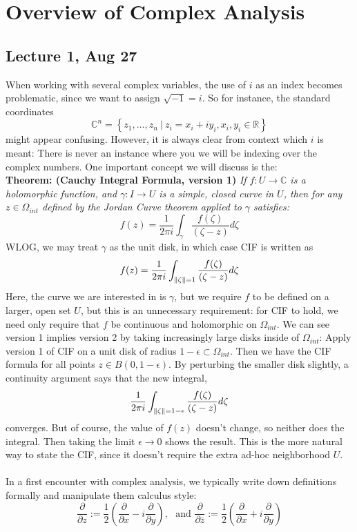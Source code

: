\documentclass[12pt]{report}
\theoremstyle{definition}
\theoremstyle{remark}
\numberwithin{equation}{section}
\theoremstyle{definition}
\newcommand{\bb}[1]{\mathbb{#1}}
\DeclarePairedDelimiter\norm{\lVert}{\rVert}%
\begin{document}
\chapter{Overview of Complex Analysis}
\section*{Lecture 1, Aug 27}
\label{sec:1}
When working with several complex variables, the use of $i$ as an index becomes problematic, since we want to assign $\sqrt{-1} = i$. So for instance, the standard coordinates 
$$
	\bb C^n = \left\{z_1,\dots,z_n\ |\ z_i = x_i + iy_i, x_i,y_i \in \bb R\right\}
$$
might appear confusing. However, it is always clear from context which $i$ is meant: There is never an instance where you we will be indexing over the complex numbers. One important concept we will discuss is the: \\
\textbf{Theorem: (Cauchy Integral Formula, version 1)} \textit{If $f: U \to \bb C$ is a holomorphic function, and $\gamma: I \to U$ is a simple, closed curve in $U$, then for any $z \in \Omega_{int}$ defined by the Jordan Curve theorem applied to $\gamma$ satisfies: }
$$
	f(z) = \frac{1}{2\pi i}\int_{\gamma} \frac{f(\zeta)}{(\zeta - z)} d\zeta 
$$
WLOG, we may treat $\gamma$ as the unit disk, in which case CIF is written as 
$$
		f(z) = \frac{1}{2\pi i}\int_{\norm{\zeta} = 1} \frac{f(\zeta)}{(\zeta - z)} d\zeta 
$$
Here, the curve we are interested in is $\gamma$, but we require $f$ to be defined on a larger, open set $U$, but this is an unnecessary requirement: for CIF to hold, we need only require that $f$ be continuous and holomorphic on $\Omega_{int}$. We can see version 1 implies version 2 	by taking increasingly large disks inside of $\Omega_{int}$: Apply version 1 of CIF on a unit disk of radius $1-\epsilon \subset \Omega_{int}$. Then we have the CIF formula for all points $z \in B(0,1-\epsilon)$. By perturbing the smaller disk slightly, a continuity argument says that the  new integral,
$$
	\frac{1}{2\pi i}\int_{\norm{\zeta} = 1-\epsilon} \frac{f(\zeta)}{(\zeta - z)} d\zeta 
$$
converges. But of course, the value of $f(z)$ doesn't change, so neither does the integral. Then taking the limit $\epsilon \to 0$ shows the result. This is the more natural way to state the CIF, since it doesn't require the extra ad-hoc neighborhood $U$. \\\\
In a first encounter with complex analysis, we typically write down definitions formally and manipulate them calculus style: 
$$
	\frac{\partial}{\partial z} := \frac{1}{2}\left(\frac{\partial}{\partial x} -i \frac{\partial}{\partial y }\right), \ \ \ \text{and   } 	\frac{\partial}{\partial \overline z} := \frac{1}{2}\left(\frac{\partial}{\partial x} +i \frac{\partial}{\partial y }\right)
$$
\end{document}
